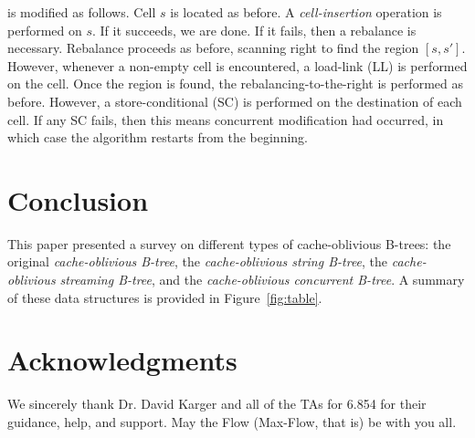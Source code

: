 \documentclass[preprint]{style}
\begin{document}
\Insert{} is modified as follows. Cell $s$ is located as before. A
\textit{cell-insertion} operation is performed on $s$. If it succeeds, we are
done. If it fails, then a rebalance is necessary. Rebalance proceeds as
before, scanning right to find the region $[s, s']$. However, whenever a
non-empty cell is encountered, a load-link (LL) is performed on the cell. Once
the region is found, the rebalancing-to-the-right is performed as before.
However, a store-conditional (SC) is performed on the destination of each
cell. If any SC fails, then this means concurrent modification had occurred,
in which case the algorithm restarts from the beginning.

\section{Conclusion}



This paper presented a survey on different types of cache-oblivious B-trees: the 
original \textit{cache-oblivious B-tree}, the \textit{cache-oblivious string
B-tree}, the \textit{cache-oblivious streaming B-tree}, and the \textit{cache-oblivious
concurrent B-tree}. A summary of these data structures is provided
in Figure~\ref{fig:table}.



\section{Acknowledgments}
We sincerely thank Dr. David Karger and all of the TAs for 6.854 
for their guidance, help, and support. May the Flow (Max-Flow, that is) be with you all.

%



\end{document}
